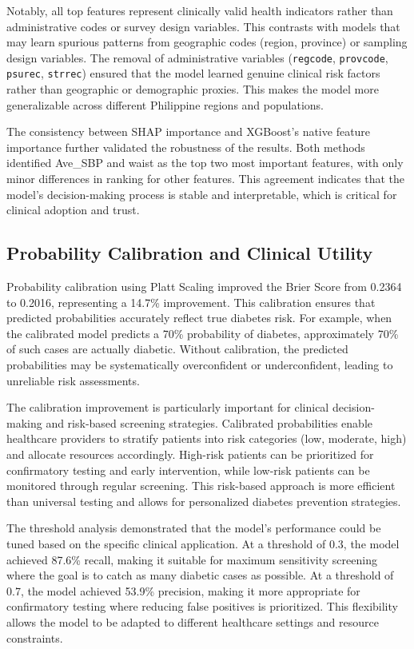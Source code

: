 Notably, all top features represent clinically valid health indicators rather than administrative codes or survey design variables. This contrasts with models that may learn spurious patterns from geographic codes (region, province) or sampling design variables. The removal of administrative variables (\texttt{regcode}, \texttt{provcode}, \texttt{psurec}, \texttt{strrec}) ensured that the model learned genuine clinical risk factors rather than geographic or demographic proxies. This makes the model more generalizable across different Philippine regions and populations.

The consistency between SHAP importance and XGBoost's native feature importance further validated the robustness of the results. Both methods identified Ave\_SBP and waist as the top two most important features, with only minor differences in ranking for other features. This agreement indicates that the model's decision-making process is stable and interpretable, which is critical for clinical adoption and trust.

\subsection{Probability Calibration and Clinical Utility}

Probability calibration using Platt Scaling improved the Brier Score from 0.2364 to 0.2016, representing a 14.7\% improvement. This calibration ensures that predicted probabilities accurately reflect true diabetes risk. For example, when the calibrated model predicts a 70\% probability of diabetes, approximately 70\% of such cases are actually diabetic. Without calibration, the predicted probabilities may be systematically overconfident or underconfident, leading to unreliable risk assessments.

The calibration improvement is particularly important for clinical decision-making and risk-based screening strategies. Calibrated probabilities enable healthcare providers to stratify patients into risk categories (low, moderate, high) and allocate resources accordingly. High-risk patients can be prioritized for confirmatory testing and early intervention, while low-risk patients can be monitored through regular screening. This risk-based approach is more efficient than universal testing and allows for personalized diabetes prevention strategies.

The threshold analysis demonstrated that the model's performance could be tuned based on the specific clinical application. At a threshold of 0.3, the model achieved 87.6\% recall, making it suitable for maximum sensitivity screening where the goal is to catch as many diabetic cases as possible. At a threshold of 0.7, the model achieved 53.9\% precision, making it more appropriate for confirmatory testing where reducing false positives is prioritized. This flexibility allows the model to be adapted to different healthcare settings and resource constraints.

